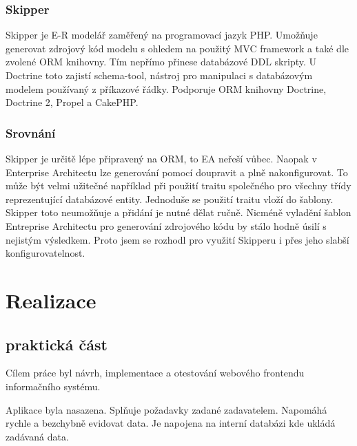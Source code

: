 \documentclass[thesis=B,czech]{FITthesis}[2012/06/26]
\begin{document}
\subsection{Skipper}
	Skipper je E-R modelář zaměřený na programovací jazyk PHP. Umožňuje generovat zdrojový kód modelu s ohledem na použitý MVC framework a také dle zvolené ORM knihovny. Tím nepřímo přinese databázové DDL skripty. U Doctrine toto zajistí schema-tool, nástroj pro manipulaci s databázovým modelem používaný z příkazové řádky. Podporuje ORM knihovny Doctrine, Doctrine 2, Propel a CakePHP.
	
\subsection{Srovnání}
	Skipper je určitě lépe připravený na ORM, to EA neřeší vůbec. Naopak v Enterprise Architectu lze generování pomocí doupravit a plně nakonfigurovat. To může být velmi užitečné například při použití traitu společného pro všechny třídy reprezentující databázové entity. Jednoduše se použití traitu vloží do šablony. Skipper toto neumožňuje a přidání je nutné dělat ručně. Nicméně vyladění šablon Entreprise Architectu pro generování zdrojového kódu by stálo hodně úsilí s nejistým výsledkem. Proto jsem se rozhodl pro využití Skipperu i přes jeho slabší konfigurovatelnost.	

\chapter{Realizace}

\section{praktická část}

\begin{conclusion}
	Cílem práce byl návrh, implementace a otestování webového frontendu informačního systému.
	
	Aplikace byla nasazena. Splňuje požadavky zadané zadavatelem. Napomáhá rychle a bezchybně evidovat data. Je napojena na interní databázi kde ukládá zadávaná data.
\end{conclusion}




\appendix
\end{document}
